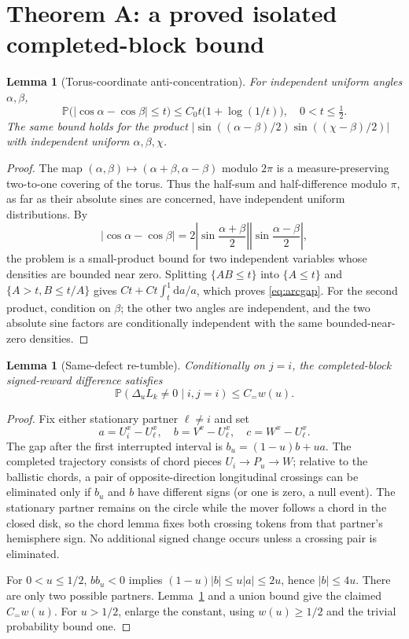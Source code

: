 \documentclass[11pt]{article}
\newtheorem{lemma}[theorem]{Lemma}
\theoremstyle{remark}\newtheorem{remark}[theorem]{Remark}
\newcommand{\Prb}{\mathbb P}
\newcommand{\dd}{\mathrm d}
\begin{document}
\section{Theorem A: a proved isolated completed-block bound}
\begin{lemma}[Torus-coordinate anti-concentration]\label{lem:torus}
For independent uniform angles $\alpha,\beta$,
\begin{equation}\label{eq:arcgap}
\Prb\bigl(|\cos\alpha-\cos\beta|\le t\bigr)
 \le C_0t\bigl(1+\log(1/t)\bigr),\quad 0<t\le\tfrac12.
\end{equation}
The same bound holds for the product $|\sin((\alpha-\beta)/2)\sin((\chi-\beta)/2)|$ with independent uniform $\alpha,\beta,\chi$.
\end{lemma}
\begin{proof}
The map $(\alpha,\beta)\mapsto (\alpha+\beta,\alpha-\beta)$ modulo $2\pi$ is a measure-preserving two-to-one covering of the torus. Thus the half-sum and half-difference modulo $\pi$, as far as their absolute sines are concerned, have independent uniform distributions. By
\[
|\cos\alpha-\cos\beta|=2\left|\sin\frac{\alpha+\beta}{2}\right|\left|\sin\frac{\alpha-\beta}{2}\right|,
\]
the problem is a small-product bound for two independent variables whose densities are bounded near zero. Splitting $\{AB\le t\}$ into $\{A\le t\}$ and $\{A>t,B\le t/A\}$ gives $Ct+Ct\int_t^1\dd a/a$, which proves \eqref{eq:arcgap}. For the second product, condition on $\beta$; the other two angles are independent, and the two absolute sine factors are conditionally independent with the same bounded-near-zero densities.
\end{proof}

\begin{lemma}[Same-defect re-tumble]\label{lem:same}
Conditionally on $j=i$, the completed-block signed-reward difference satisfies
\[\Prb(\Delta_u L_k\ne0\mid i,j=i)\le C_{=}w(u).\]
\end{lemma}
\begin{proof}
Fix either stationary partner $\ell\ne i$ and set
\[a=U_i^x-U_\ell^x,\quad b=V^x-U_\ell^x,\quad c=W^x-U_\ell^x.\]
The gap after the first interrupted interval is $b_u=(1-u)b+ua$. The completed trajectory consists of chord pieces $U_i\to P_u\to W$; relative to the ballistic chords, a pair of opposite-direction longitudinal crossings can be eliminated only if $b_u$ and $b$ have different signs (or one is zero, a null event). The stationary partner remains on the circle while the mover follows a chord in the closed disk, so the chord lemma fixes both crossing tokens from that partner's hemisphere sign. No additional signed change occurs unless a crossing pair is eliminated.

For $0<u\le1/2$, $bb_u<0$ implies $(1-u)|b|\le u|a|\le2u$, hence $|b|\le4u$. There are only two possible partners. Lemma~\ref{lem:torus} and a union bound give the claimed $C_{=}w(u)$. For $u>1/2$, enlarge the constant, using $w(u)\ge1/2$ and the trivial probability bound one.
\end{proof}
\end{document}
